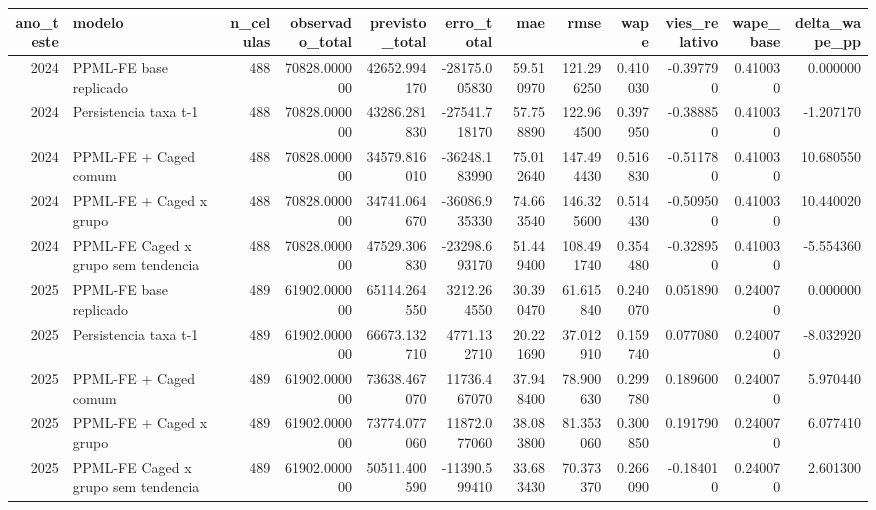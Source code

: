 \begin{tabular}{rlrrrrrrrrrr}
\toprule
ano_teste & modelo & n_celulas & observado_total & previsto_total & erro_total & mae & rmse & wape & vies_relativo & wape_base & delta_wape_pp \\
\midrule
2024 & PPML-FE base replicado & 488 & 70828.000000 & 42652.994170 & -28175.005830 & 59.510970 & 121.296250 & 0.410030 & -0.397790 & 0.410030 & 0.000000 \\
2024 & Persistencia taxa t-1 & 488 & 70828.000000 & 43286.281830 & -27541.718170 & 57.758890 & 122.964500 & 0.397950 & -0.388850 & 0.410030 & -1.207170 \\
2024 & PPML-FE + Caged comum & 488 & 70828.000000 & 34579.816010 & -36248.183990 & 75.012640 & 147.494430 & 0.516830 & -0.511780 & 0.410030 & 10.680550 \\
2024 & PPML-FE + Caged x grupo & 488 & 70828.000000 & 34741.064670 & -36086.935330 & 74.663540 & 146.325600 & 0.514430 & -0.509500 & 0.410030 & 10.440020 \\
2024 & PPML-FE Caged x grupo sem tendencia & 488 & 70828.000000 & 47529.306830 & -23298.693170 & 51.449400 & 108.491740 & 0.354480 & -0.328950 & 0.410030 & -5.554360 \\
2025 & PPML-FE base replicado & 489 & 61902.000000 & 65114.264550 & 3212.264550 & 30.390470 & 61.615840 & 0.240070 & 0.051890 & 0.240070 & 0.000000 \\
2025 & Persistencia taxa t-1 & 489 & 61902.000000 & 66673.132710 & 4771.132710 & 20.221690 & 37.012910 & 0.159740 & 0.077080 & 0.240070 & -8.032920 \\
2025 & PPML-FE + Caged comum & 489 & 61902.000000 & 73638.467070 & 11736.467070 & 37.948400 & 78.900630 & 0.299780 & 0.189600 & 0.240070 & 5.970440 \\
2025 & PPML-FE + Caged x grupo & 489 & 61902.000000 & 73774.077060 & 11872.077060 & 38.083800 & 81.353060 & 0.300850 & 0.191790 & 0.240070 & 6.077410 \\
2025 & PPML-FE Caged x grupo sem tendencia & 489 & 61902.000000 & 50511.400590 & -11390.599410 & 33.683430 & 70.373370 & 0.266090 & -0.184010 & 0.240070 & 2.601300 \\
\bottomrule
\end{tabular}

